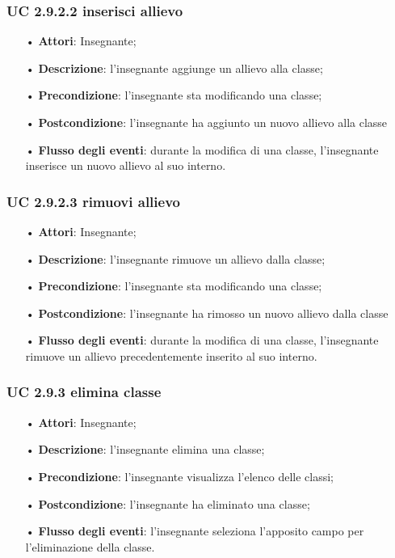 \subsubsection{UC 2.9.2.2 inserisci allievo}
\begin{itemize}
	\item[•] \textbf{Attori}: Insegnante;
	\item[•] \textbf{Descrizione}: l'insegnante aggiunge un allievo alla classe;
	\item[•] \textbf{Precondizione}: l'insegnante sta modificando una classe;
	\item[•] \textbf{Postcondizione}: l'insegnante ha aggiunto un nuovo allievo alla classe
	\item[•] \textbf{Flusso degli eventi}: durante la modifica di una classe, l'insegnante inserisce un nuovo allievo al suo interno.
\end{itemize}

\subsubsection{UC 2.9.2.3 rimuovi allievo}
\begin{itemize}
	\item[•] \textbf{Attori}: Insegnante;
	\item[•] \textbf{Descrizione}: l'insegnante rimuove un allievo dalla classe;
	\item[•] \textbf{Precondizione}: l'insegnante sta modificando una classe;
	\item[•] \textbf{Postcondizione}: l'insegnante ha rimosso un nuovo allievo dalla classe
	\item[•] \textbf{Flusso degli eventi}: durante la modifica di una classe, l'insegnante rimuove un allievo precedentemente inserito al suo interno.
\end{itemize}


\subsubsection{UC 2.9.3 elimina classe}
\begin{itemize}
	\item[•] \textbf{Attori}: Insegnante;
	\item[•] \textbf{Descrizione}: l'insegnante elimina una classe;
	\item[•] \textbf{Precondizione}: l'insegnante visualizza l'elenco delle classi;
	\item[•] \textbf{Postcondizione}: l'insegnante ha eliminato una classe;
	\item[•] \textbf{Flusso degli eventi}:  l'insegnante seleziona l'apposito campo per l'eliminazione della classe.
\end{itemize}
